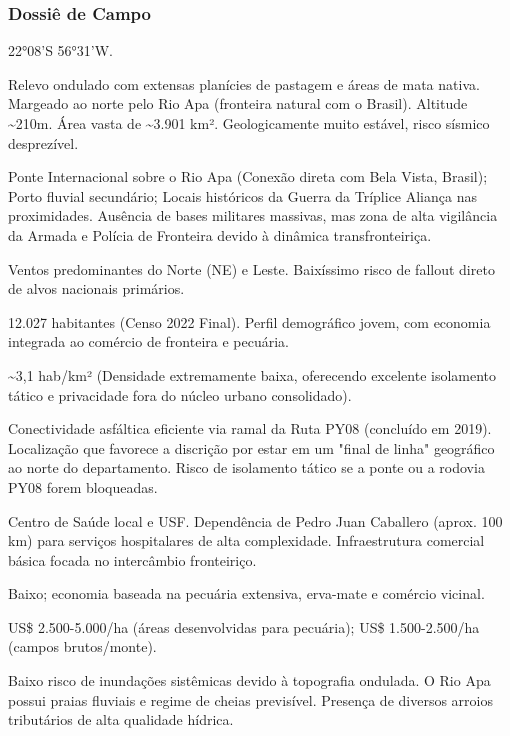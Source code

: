 \subsubsection{Dossiê de Campo}
\begin{description}[style=nextline,leftmargin=0.5cm,font=\bfseries]
\item[Coordenadas]  22°08'S 56°31'W.
\item[Topografia]  Relevo ondulado com extensas planícies de pastagem e áreas de mata nativa. Margeado ao norte pelo Rio Apa (fronteira natural com o Brasil). Altitude \textasciitilde 210m. Área vasta de \textasciitilde 3.901 km². Geologicamente muito estável, risco sísmico desprezível.
\item[Alvos Estratégicos]  Ponte Internacional sobre o Rio Apa (Conexão direta com Bela Vista, Brasil); Porto fluvial secundário; Locais históricos da Guerra da Tríplice Aliança nas proximidades. Ausência de bases militares massivas, mas zona de alta vigilância da Armada e Polícia de Fronteira devido à dinâmica transfronteiriça.
\item[Fallout]  Ventos predominantes do Norte (NE) e Leste. Baixíssimo risco de fallout direto de alvos nacionais primários.
\item[População]  12.027 habitantes (Censo 2022 Final). Perfil demográfico jovem, com economia integrada ao comércio de fronteira e pecuária.
\item[Densidade]  \textasciitilde 3,1 hab/\allowbreak km² (Densidade extremamente baixa, oferecendo excelente isolamento tático e privacidade fora do núcleo urbano consolidado).
\item[Vias de Acesso]  Conectividade asfáltica eficiente via ramal da Ruta PY08 (concluído em 2019). Localização que favorece a discrição por estar em um "final de linha" geográfico ao norte do departamento. Risco de isolamento tático se a ponte ou a rodovia PY08 forem bloqueadas.
\item[Serviços]  Centro de Saúde local e USF. Dependência de Pedro Juan Caballero (aprox. 100 km) para serviços hospitalares de alta complexidade. Infraestrutura comercial básica focada no intercâmbio fronteiriço.
\item[Custo de Vida]  Baixo; economia baseada na pecuária extensiva, erva-mate e comércio vicinal.
\item[Preço da Terra]  US\$ 2.500-5.000/\allowbreak ha (áreas desenvolvidas para pecuária); US\$ 1.500-2.500/\allowbreak ha (campos brutos/\allowbreak monte).
\item[Hidrologia]  Baixo risco de inundações sistêmicas devido à topografia ondulada. O Rio Apa possui praias fluviais e regime de cheias previsível. Presença de diversos arroios tributários de alta qualidade hídrica.

\end{description}
